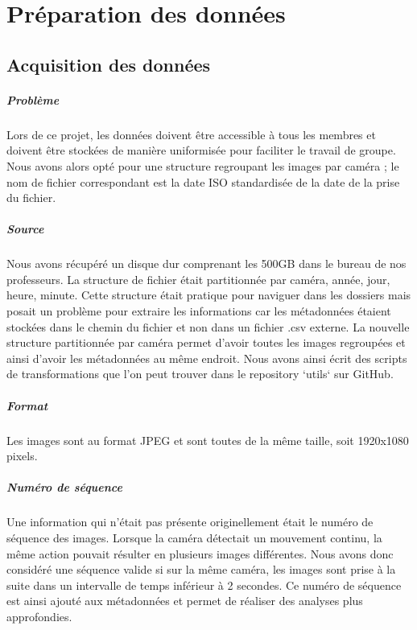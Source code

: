 \chapter{Préparation des données}

\section{Acquisition des données}

\paragraph*{Problème} Lors de ce projet, les données doivent être accessible à tous les membres et doivent être stockées de manière uniformisée pour faciliter le travail de groupe. Nous avons alors opté pour une structure regroupant les images par caméra ; le nom de fichier correspondant est la date ISO standardisée de la date de la prise du fichier.

\paragraph*{Source} Nous avons récupéré un disque dur comprenant les 500GB dans le bureau de nos professeurs. La structure de fichier était partitionnée par caméra, année, jour, heure, minute. Cette structure était pratique pour naviguer dans les dossiers mais posait un problème pour extraire les informations car les métadonnées étaient stockées dans le chemin du fichier et non dans un fichier .csv externe. La nouvelle structure partitionnée par caméra permet d'avoir toutes les images regroupées et ainsi d'avoir les métadonnées au même endroit. Nous avons ainsi écrit des scripts de transformations que l'on peut trouver dans le repository `utils` sur GitHub.

\paragraph*{Format} Les images sont au format JPEG et sont toutes de la même taille, soit 1920x1080 pixels.

\paragraph*{Numéro de séquence} Une information qui n'était pas présente originellement était le numéro de séquence des images. Lorsque la caméra détectait un mouvement continu, la même action pouvait résulter en plusieurs images différentes. Nous avons donc considéré une séquence valide si sur la même caméra, les images sont prise à la suite dans un intervalle de temps inférieur à 2 secondes. Ce numéro de séquence est ainsi ajouté aux métadonnées et permet de réaliser des analyses plus approfondies.

